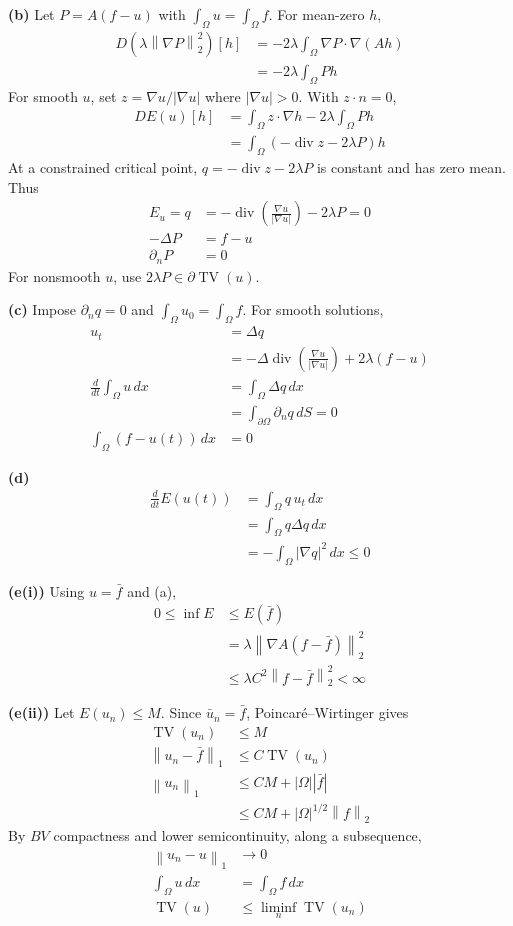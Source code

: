 \documentclass[12pt,letterpaper]{article}
\newcommand{\TV}{\operatorname{TV}}
\newcommand{\diver}{\operatorname{div}}
\newcommand{\norm}[1]{\left\lVert #1\right\rVert}
\newcommand{\partlabel}[1]{\par\medskip\noindent\textbf{(#1)}\enspace}
\begin{document}
\partlabel{b}
Let $P=A(f-u)$ with $\int_\Omega u=\int_\Omega f$.
For mean-zero $h$,
\begin{align*}
 D\!\left(\lambda\norm{\nabla P}_2^2\right)[h]
 &=-2\lambda\int_\Omega\nabla P\cdot\nabla(Ah)\\
 &=-2\lambda\int_\Omega Ph
\end{align*}
For smooth $u$, set $z=\nabla u/|\nabla u|$ where $|\nabla u|>0$.
With $z\cdot n=0$,
\begin{align*}
 DE(u)[h]&=\int_\Omega z\cdot\nabla h-2\lambda\int_\Omega Ph\\
 &=\int_\Omega(-\diver z-2\lambda P)h
\end{align*}
At a constrained critical point, $q=-\diver z-2\lambda P$ is
constant and has zero mean. Thus
\begin{align*}
 E_u=q&=-\diver\left(\frac{\nabla u}{|\nabla u|}\right)-2\lambda P=0\\
 -\Delta P&=f-u\\
 \partial_nP&=0
\end{align*}
For nonsmooth $u$, use $2\lambda P\in\partial\TV(u)$.

\partlabel{c}
Impose $\partial_nq=0$ and $\int_\Omega u_0=\int_\Omega f$.
For smooth solutions,
\begin{align*}
 u_t&=\Delta q\\
 &=-\Delta\diver\left(\frac{\nabla u}{|\nabla u|}\right)
      +2\lambda(f-u)\\
 \frac{d}{dt}\int_\Omega u\,dx
 &=\int_\Omega\Delta q\,dx\\
 &=\int_{\partial\Omega}\partial_nq\,dS=0\\
 \int_\Omega(f-u(t))\,dx&=0
\end{align*}
\partlabel{d}
\begin{align*}
 \frac{d}{dt}E(u(t))
 &=\int_\Omega q\,u_t\,dx\\
 &=\int_\Omega q\Delta q\,dx\\
 &=-\int_\Omega|\nabla q|^2\,dx\leq0
\end{align*}

\partlabel{e(i)}
Using $u=\bar f$ and (a),
\begin{align*}
 0\leq\inf E&\leq E(\bar f)\\
 &=\lambda\norm{\nabla A(f-\bar f)}_2^2\\
 &\leq\lambda C^2\norm{f-\bar f}_2^2<\infty
\end{align*}

\partlabel{e(ii)}
Let $E(u_n)\leq M$. Since $\bar u_n=\bar f$, Poincar\'e--Wirtinger gives
\begin{align*}
 \TV(u_n)&\leq M\\
 \norm{u_n-\bar f}_1&\leq C\TV(u_n)\\
 \norm{u_n}_1&\leq CM+|\Omega||\bar f|\\
 &\leq CM+|\Omega|^{1/2}\norm f_2
\end{align*}
By $BV$ compactness and lower semicontinuity, along a subsequence,
\begin{align*}
 \norm{u_n-u}_1&\longrightarrow0\\
 \int_\Omega u\,dx&=\int_\Omega f\,dx\\
 \TV(u)&\leq\liminf_n\TV(u_n)
\end{align*}
\end{document}
